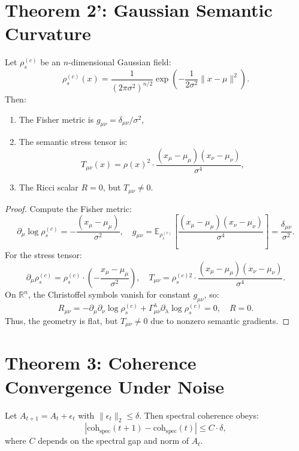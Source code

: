 \documentclass[12pt]{article}
\begin{document}
\section*{Theorem 2': Gaussian Semantic Curvature}
\begin{theorem}
Let \(\rho_s^{(c)}\) be an \(n\)-dimensional Gaussian field:
\[
\rho_s^{(c)}(x) = \frac{1}{(2\pi \sigma^2)^{n/2}} \exp\left( -\frac{1}{2\sigma^2} \|x - \mu\|^2 \right).
\]
Then:
\begin{enumerate}
  \item The Fisher metric is \(g_{\mu\nu} = \delta_{\mu\nu}/\sigma^2\),
  \item The semantic stress tensor is:
  \[
  T_{\mu\nu}(x) = \rho(x)^2 \cdot \frac{(x_\mu - \mu_\mu)(x_\nu - \mu_\nu)}{\sigma^4},
  \]
  \item The Ricci scalar \(R = 0\), but \(T_{\mu\nu} \neq 0\).
\end{enumerate}
\end{theorem}

\begin{proof}
Compute the Fisher metric:
\[
\partial_\mu \log \rho_s^{(c)} = -\frac{(x_\mu - \mu_\mu)}{\sigma^2}, \quad g_{\mu\nu} = \mathbb{E}_{\rho_s^{(c)}} \left[ \frac{(x_\mu - \mu_\mu)(x_\nu - \mu_\nu)}{\sigma^4} \right] = \frac{\delta_{\mu\nu}}{\sigma^2}.
\]
For the stress tensor:
\[
\partial_\mu \rho_s^{(c)} = \rho_s^{(c)} \cdot \left( -\frac{x_\mu - \mu_\mu}{\sigma^2} \right), \quad T_{\mu\nu} = \rho_s^{(c)2} \cdot \frac{(x_\mu - \mu_\mu)(x_\nu - \mu_\nu)}{\sigma^4}.
\]
On \(\mathbb{R}^n\), the Christoffel symbols vanish for constant \(g_{\mu\nu}\), so:
\[
R_{\mu\nu} = -\partial_\mu \partial_\nu \log \rho_s^{(c)} + \Gamma^\lambda_{\mu\nu} \partial_\lambda \log \rho_s^{(c)} = 0, \quad R = 0.
\]
Thus, the geometry is flat, but \(T_{\mu\nu} \neq 0\) due to nonzero semantic gradients.
\end{proof}

\section*{Theorem 3: Coherence Convergence Under Noise}
\begin{theorem}
Let \(A_{t+1} = A_t + \epsilon_t\) with \(\|\epsilon_t\|_2 \leq \delta\). Then spectral coherence obeys:
\[
|\text{coh}_{\text{spec}}(t+1) - \text{coh}_{\text{spec}}(t)| \leq C \cdot \delta,
\]
where \(C\) depends on the spectral gap and norm of \(A_t\).
\end{theorem}
\end{document}
